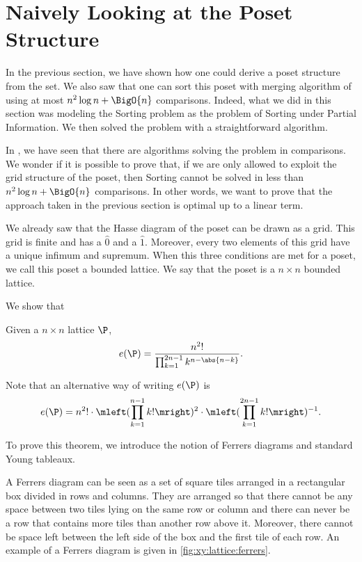 \section{Naively Looking at the Poset Structure}
\label{tree:xy:grid}

In the previous section, we have shown how one could derive a poset structure
from the \XY set. We also saw that one can sort this \XY poset with
merging algorithm of 
using at most \(n^2 \log n + \BigO{n}\) comparisons. Indeed, what we
did in this section was modeling the Sorting \XY problem as the problem of
Sorting under Partial Information. We then solved the problem with a
straightforward algorithm.

In , we have seen that there are algorithms solving the \SUPI
problem in  comparisons. We wonder if it is possible to prove
that, if we are only allowed to exploit the grid structure of the \XY poset,
then Sorting \XY cannot be solved in less than \(n^2 \log n + \BigO{n}\)
comparisons. In other words, we want to prove that the approach taken in the
previous section is optimal up to a linear term.

We already saw that the Hasse diagram of the poset \XY can be drawn as a grid.
This grid is finite and has a \(\hat{0}\) and a \(\hat{1}\). Moreover, every
two elements of this grid have a unique infimum and supremum. When this three
conditions are met for a poset, we call this poset a bounded lattice. We say
that the poset \XY is a \( n \times n \) bounded lattice.

We show that
\begin{theorem}
Given a \( n \times n \) lattice \(\P\),
\begin{displaymath}
e(\P) = \frac{n^2!}{\prod_{k=1}^{2n-1} k^{n - \abs{n-k}}}.
\end{displaymath}
\end{theorem}
Note that an alternative way of writing \(e(\P)\) is
\begin{displaymath}
e(\P) = n^2! \cdot \mleft(\prod_{k=1}^{n-1} k!\mright)^2 \cdot
\mleft(\prod_{k=1}^{2n-1} k!\mright)^{-1}.
\end{displaymath}

To prove this theorem, we introduce the notion of Ferrers diagrams and standard Young tableaux.

A Ferrers diagram can be seen as a set of square tiles arranged in a
rectangular
box divided in rows and columns. They are arranged so that there cannot be any space between two tiles
lying on the same row or column and there can never be a row that contains more
tiles than another row above it. Moreover, there cannot be space left between
the left side of the box and the first tile of each row. An example of a
Ferrers diagram is given in \ref{fig:xy:lattice:ferrers}.

